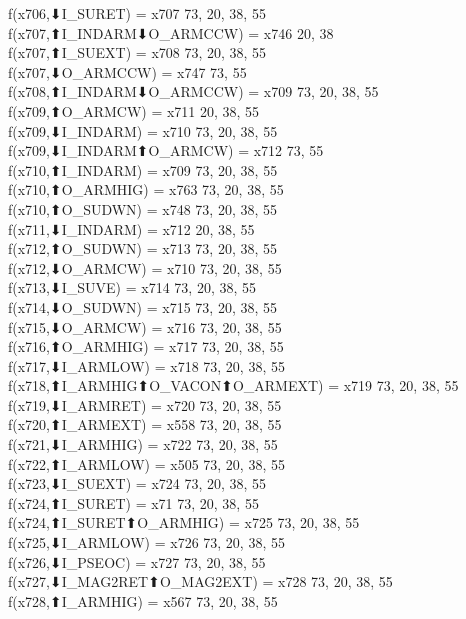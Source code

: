 f(x706,⬇I_SURET) = x707 {73, 20, 38, 55} \\
f(x707,⬆I_INDARM⬇O_ARMCCW) = x746 {20, 38} \\
f(x707,⬆I_SUEXT) = x708 {73, 20, 38, 55} \\
f(x707,⬇O_ARMCCW) = x747 {73, 55} \\
f(x708,⬆I_INDARM⬇O_ARMCCW) = x709 {73, 20, 38, 55} \\
f(x709,⬆O_ARMCW) = x711 {20, 38, 55} \\
f(x709,⬇I_INDARM) = x710 {73, 20, 38, 55} \\
f(x709,⬇I_INDARM⬆O_ARMCW) = x712 {73, 55} \\
f(x710,⬆I_INDARM) = x709 {73, 20, 38, 55} \\
f(x710,⬆O_ARMHIG) = x763 {73, 20, 38, 55} \\
f(x710,⬆O_SUDWN) = x748 {73, 20, 38, 55} \\
f(x711,⬇I_INDARM) = x712 {20, 38, 55} \\
f(x712,⬆O_SUDWN) = x713 {73, 20, 38, 55} \\
f(x712,⬇O_ARMCW) = x710 {73, 20, 38, 55} \\
f(x713,⬇I_SUVE) = x714 {73, 20, 38, 55} \\
f(x714,⬇O_SUDWN) = x715 {73, 20, 38, 55} \\
f(x715,⬇O_ARMCW) = x716 {73, 20, 38, 55} \\
f(x716,⬆O_ARMHIG) = x717 {73, 20, 38, 55} \\
f(x717,⬇I_ARMLOW) = x718 {73, 20, 38, 55} \\
f(x718,⬆I_ARMHIG⬆O_VACON⬆O_ARMEXT) = x719 {73, 20, 38, 55} \\
f(x719,⬇I_ARMRET) = x720 {73, 20, 38, 55} \\
f(x720,⬆I_ARMEXT) = x558 {73, 20, 38, 55} \\
f(x721,⬇I_ARMHIG) = x722 {73, 20, 38, 55} \\
f(x722,⬆I_ARMLOW) = x505 {73, 20, 38, 55} \\
f(x723,⬇I_SUEXT) = x724 {73, 20, 38, 55} \\
f(x724,⬆I_SURET) = x71 {73, 20, 38, 55} \\
f(x724,⬆I_SURET⬆O_ARMHIG) = x725 {73, 20, 38, 55} \\
f(x725,⬇I_ARMLOW) = x726 {73, 20, 38, 55} \\
f(x726,⬇I_PSEOC) = x727 {73, 20, 38, 55} \\
f(x727,⬇I_MAG2RET⬆O_MAG2EXT) = x728 {73, 20, 38, 55} \\
f(x728,⬆I_ARMHIG) = x567 {73, 20, 38, 55} \\
